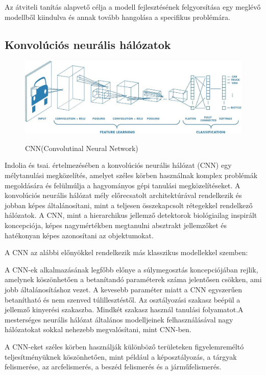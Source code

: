 \documentclass[12pt,a4]{article}
\begin{document}
     Az átviteli tanítás alapvető célja a modell fejlesztésének felgyorsítása egy meglévő modellből kiindulva és annak tovább hangolása a specifikus problémára.
 
	\subsection{Konvolúciós neurális hálózatok}
	\begin{figure}[h]	
		\centering
		\includegraphics[width=1\linewidth]{CNN}
        \label{fig:cnn}
		\caption{CNN(Convolutinal Neural Network)}
	\end{figure}
 
	\cite{CNN}Indolia és tsai. értelmezésében a konvolúciós neurális hálózat (CNN) egy
	mélytanulási megközelítés, amelyet széles körben használnak komplex problémák megoldására és felülmúlja a hagyományos gépi tanulási megközelítéseket. A konvolúciós neurális hálózat mély előrecsatolt architektúrával rendelkezik és jobban képes általánosítani, mint a teljesen összekapcsolt rétegekkel rendelkező hálózatok.
	A CNN, mint a hierarchikus jellemző detektorok biológiailag inspirált koncepciója, képes nagymértékben megtanulni
	absztrakt jellemzőket és hatékonyan képes azonosítani az objektumokat.
	
	A CNN az alábbi előnyökkel rendelkezik más klasszikus modellekkel szemben:
	
	  A CNN-ek alkalmazásának legfőbb előnye a súlymegosztás koncepciójában rejlik, amelynek köszönhetően a 
    betanítandó paraméterek száma jelentősen csökken, ami jobb általánosításhoz vezet. 
	A kevesebb paraméter miatt a CNN egyszerűen betanítható és nem szenved túlillesztéstől. Az osztályozási szakasz beépül a jellemző kinyerési szakaszba. Mindkét szakasz használ tanulási folyamatot.A mesterséges neurális hálózat általános modelljeinek felhasználásával nagy hálózatokat sokkal nehezebb megvalósítani,
	mint CNN-ben.
	
	A CNN-eket széles körben használják különböző területeken figyelemreméltó
	teljesítményüknek köszönhetően, mint például a képosztályozás, a tárgyak felismerése, az arcfelismerés, a beszéd
	felismerés és a járműfelismerés.
	
\end{document}
